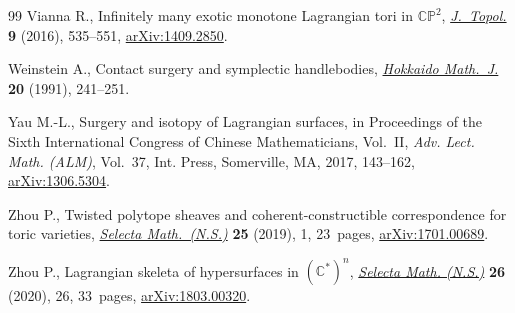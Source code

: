 \documentclass[10pt,a4paper]{amsart}
\numberwithin{equation}{section}
\begin{document}
\begin{thebibliography}{99}
Vianna R., Infinitely many exotic monotone {L}agrangian tori in
 {$\mathbb{CP}^2$}, \href{https://doi.org/10.1112/jtopol/jtw002}{\textit{J.~Topol.}} \textbf{9} (2016), 535--551,
 \href{https://arxiv.org/abs/1409.2850}{arXiv:1409.2850}.

Weinstein A., Contact surgery and symplectic handlebodies, \href{https://doi.org/10.14492/hokmj/1381413841}{\textit{Hokkaido
 Math.~J.}} \textbf{20} (1991), 241--251.

Yau M.-L., Surgery and isotopy of {L}agrangian surfaces, in Proceedings of the
 {S}ixth {I}nternational {C}ongress of {C}hinese {M}athematicians,
 {V}ol.~{II}, \textit{Adv. Lect. Math. (ALM)}, Vol.~37, Int. Press,
 Somerville, MA, 2017, 143--162, \href{https://arxiv.org/abs/1306.5304}{arXiv:1306.5304}.

Zhou P., Twisted polytope sheaves and coherent-constructible correspondence for
 toric varieties, \href{https://doi.org/10.1007/s00029-019-0459-x}{\textit{Selecta Math.~(N.S.)}} \textbf{25} (2019), 1,
 23~pages, \href{https://arxiv.org/abs/1701.00689}{arXiv:1701.00689}.

Zhou P., Lagrangian skeleta of hypersurfaces in {$(\mathbb C^*)^n$},
 \href{https://doi.org/10.1007/s00029-020-00555-9}{\textit{Selecta Math. (N.S.)}} \textbf{26} (2020), 26, 33~pages,
 \href{https://arxiv.org/abs/1803.00320}{arXiv:1803.00320}.

\end{thebibliography}
\end{document}
